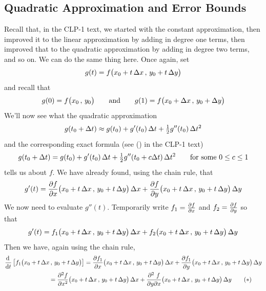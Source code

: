 \subsection{Quadratic Approximation and Error Bounds}\label{sec error}
Recall that, in the CLP-1 text, we started with the constant approximation,
then improved it to the linear approximation by adding in degree one terms,
then improved that to the quadratic approximation by adding in degree two
terms, and so on. We can do the same thing here.
Once again, set 
\begin{equation*}
g(t) = f\big(x_0+t\,\Delta x\,,\,y_0+t\,\Delta y\big)
\end{equation*}
and recall that
\begin{equation*}
g(0) = f\big(x_0\,,\,y_0\big)\qquad\text{and}\qquad
g(1) = f\big(x_0 + \Delta x\,,\,y_0+\Delta y\big)
\end{equation*}
We'll now see what the quadratic approximation
\begin{equation*}
g(t_0+\Delta t) \approx g(t_0) +g'(t_0)\,\Delta t +\tfrac{1}{2} g''(t_0)\,\Delta t^2
\end{equation*}
and the corresponding exact formula (see ()
in the CLP-1 text)
\begin{equation*}
g(t_0+\Delta t) = g(t_0) +g'(t_0)\,\Delta t +\tfrac{1}{2} g''(t_0+c\Delta t)\,\Delta t^2
                    \qquad\text{for some $0\le c\le 1$} 
\end{equation*}
tells us about $f$. We have already found, using the chain rule, that
\begin{equation*}
g'(t) = \pdiff{f}{x}\big(x_0+t\,\De x\,,\,y_0+t\,\De y\big)\,\De x
       + \pdiff{f}{y}\big(x_0+t\,\De x\,,\,y_0+t\,\De y\big)\,\De y
\end{equation*}
We now need to evaluate $g''(t)$. Temporarily write $f_1=\pdiff{f}{x}$
and $f_2=\pdiff{f}{y}$ so that
\begin{equation*}
g'(t) = f_1\big(x_0+t\,\Delta x\,,\,y_0+t\,\Delta y\big)\,\Delta x
       + f_2\big(x_0+t\,\Delta x\,,\,y_0+t\,\Delta y\big)\,\Delta y
\end{equation*}
Then we have, again using the chain rule,
\begin{align*}
&\diff{}{t}\left[f_1\big(x_0+t\,\De x\,,\,y_0+t\,\De y\big)\right]
=\frac{\partial f_1}{\partial x}\big(x_0+t\,\De x\,,\,y_0+t\,\De y\big)
                                                                  \,\De x
 +\frac{\partial f_1}{\partial y}
              \big(x_0+t\,\De x\,,\,y_0+t\,\De y\big) \,\De y \\
&\hskip1in
=\frac{\partial^2 f}{\partial x^2}\big(x_0+t\,\De x\,,\,y_0+t\,\De y\big)
                                                                  \,\De x
 +\frac{\partial^2\ f}{\partial y\partial x}
              \big(x_0+t\,\De x\,,\,y_0+t\,\De y\big) \,\De y
\tag{$*$}\end{align*}
